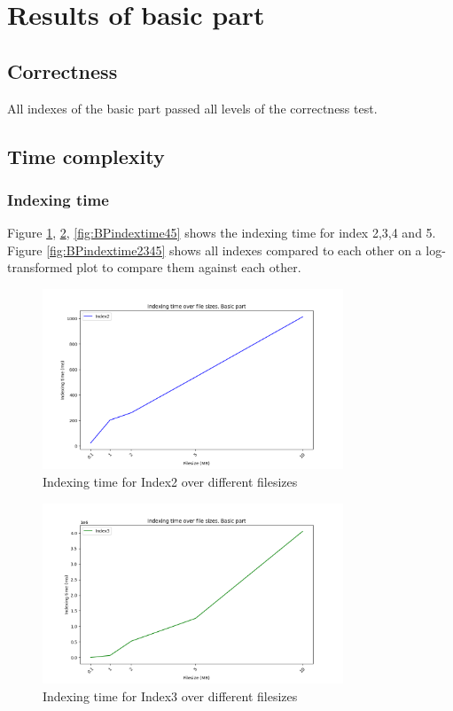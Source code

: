 \section{Results of basic part}
\subsection{Correctness}
All indexes  of the basic part passed all levels of the correctness test.

\subsection{Time complexity}
\subsubsection{Indexing time}
Figure \ref{fig:BPindextime2}, \ref{fig:BPindextime3}, \ref{fig:BPindextime45} shows the indexing time for index 2,3,4 and 5. Figure \ref{fig:BPindextime2345} shows all indexes compared to each other on a log-transformed plot to compare them against each other.


\begin{figure}[H]
    \centering
     \includegraphics[width=0.8\textwidth]{LaTeX/Pictures/Results/BPIndexing[2].png}
    \caption{Indexing time for Index2 over different filesizes}
    \label{fig:BPindextime2}
\end{figure}

\begin{figure}[H]
    \centering
    \includegraphics[width=0.8\textwidth]{LaTeX/Pictures/Results/BPIndexing[3].png}
    \caption{Indexing time for Index3 over different filesizes}
    \label{fig:BPindextime3}
\end{figure}

